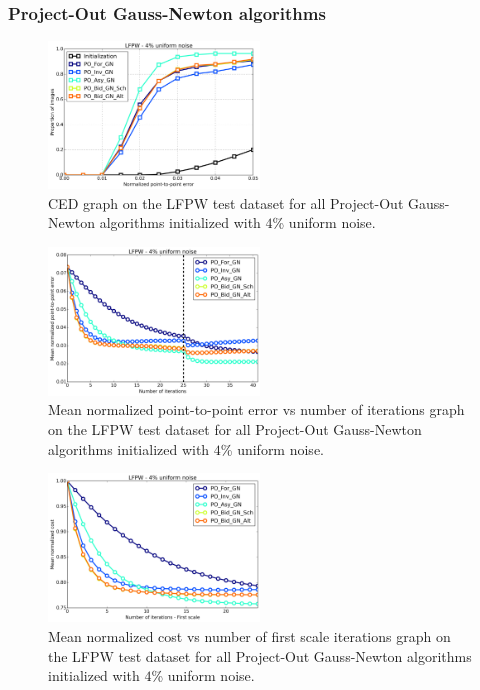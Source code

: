 \subsubsection{Project-Out Gauss-Newton algorithms}

\begin{figure}[h!]
    \centering
    \includegraphics[width=0.50\textwidth]{experiments/algorithms/po_gn/ced_po_gn_4.png}
    \caption{CED graph on the LFPW test dataset for all Project-Out Gauss-Newton algorithms initialized with $4$\% uniform noise.}
    \label{fig:ced_po_gn_4}
\end{figure}

\begin{figure}[h!]
    \centering
    \includegraphics[width=0.50\textwidth]{experiments/algorithms/po_gn/mean_error_vs_iters_po_gn_4.png}
    \caption{Mean normalized point-to-point error vs number of iterations graph on the LFPW test dataset for all Project-Out Gauss-Newton algorithms initialized with $4$\% uniform noise.}
    \label{fig:mean_error_vs_iters_po_gn_4}
\end{figure}

\begin{figure}[h!]
    \centering
    \includegraphics[width=0.50\textwidth]{experiments/algorithms/po_gn/mean_cost_vs_iters1_po_gn_4.png}
    \caption{Mean normalized cost vs number of first scale iterations graph on the LFPW test dataset for all Project-Out Gauss-Newton algorithms initialized with $4$\% uniform noise.}
    \label{fig:mean_cost_vs_iters1_po_gn_4}
\end{figure}

